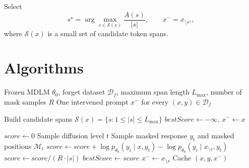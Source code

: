 \documentclass{article}
\begin{document}
Select
\begin{equation}
s^\star
=
\arg\max_{s\in\mathcal{S}(x)}
\frac{A(s)}{|s|},
\qquad
x^{-}=x_{\setminus s^\star},
\label{eq:keyspan}
\end{equation}
where $\mathcal{S}(x)$ is a small set of candidate token spans.

\section{Algorithms}

\begin{algorithm}[t]
\caption{Precompute minimal prompt interventions}
\label{alg:intervention}
\begin{algorithmic}[1]
\Require Frozen MDLM $\theta_0$, forget dataset $\mathcal{D}_f$, maximum span length $L_{\max}$, number of mask samples $R$
\Ensure One intervened prompt $x^{-}$ for every $(x,y)\in\mathcal{D}_f$

    \State Build candidate spans $\mathcal{S}(x)=\{s:1\le |s|\le L_{\max}\}$
    \State $bestScore \gets -\infty$, $x^{-}\gets x$

        \State $score\gets 0$
            \State Sample diffusion level $t$
            \State Sample masked response $y_t$ and masked positions $\mathcal{M}_t$
                \State $score\gets score + \log p_{\theta_0}(y_i\mid x,y_t)-\log p_{\theta_0}(y_i\mid x_{\setminus s},y_t)$
            \EndFor
        \EndFor
        \State $score\gets score/(R\cdot |s|)$
            \State $bestScore\gets score$
            \State $x^{-}\gets x_{\setminus s}$
        \EndIf
    \EndFor
    \State Cache $(x,y,x^{-})$
\EndFor
\end{algorithmic}
\end{algorithm}
\end{document}

